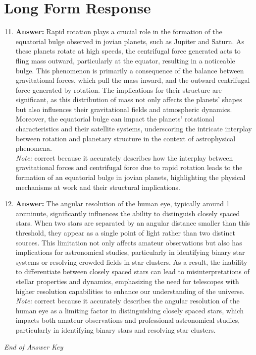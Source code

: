 \documentclass[12pt]{article}
\begin{document}
\section*{Long Form Response}
\begin{enumerate}[label=\arabic*.]
\setcounter{enumi}{10}
\item \textbf{Answer:} Rapid rotation plays a crucial role in the formation of the equatorial bulge observed in jovian planets, such as Jupiter and Saturn. As these planets rotate at high speeds, the centrifugal force generated acts to fling mass outward, particularly at the equator, resulting in a noticeable bulge. This phenomenon is primarily a consequence of the balance between gravitational forces, which pull the mass inward, and the outward centrifugal force generated by rotation. The implications for their structure are significant, as this distribution of mass not only affects the planets' shapes but also influences their gravitational fields and atmospheric dynamics. Moreover, the equatorial bulge can impact the planets' rotational characteristics and their satellite systems, underscoring the intricate interplay between rotation and planetary structure in the context of astrophysical phenomena.
\\ \textit{Note:} correct because it accurately describes how the interplay between gravitational forces and centrifugal force due to rapid rotation leads to the formation of an equatorial bulge in jovian planets, highlighting the physical mechanisms at work and their structural implications.
\item \textbf{Answer:} The angular resolution of the human eye, typically around 1 arcminute, significantly influences the ability to distinguish closely spaced stars. When two stars are separated by an angular distance smaller than this threshold, they appear as a single point of light rather than two distinct sources. This limitation not only affects amateur observations but also has implications for astronomical studies, particularly in identifying binary star systems or resolving crowded fields in star clusters. As a result, the inability to differentiate between closely spaced stars can lead to misinterpretations of stellar properties and dynamics, emphasizing the need for telescopes with higher resolution capabilities to enhance our understanding of the universe.
\\ \textit{Note:} correct because it accurately describes the angular resolution of the human eye as a limiting factor in distinguishing closely spaced stars, which impacts both amateur observations and professional astronomical studies, particularly in identifying binary stars and resolving star clusters.
\end{enumerate}

\vfill
\noindent\textit{End of Answer Key}
\end{document}
